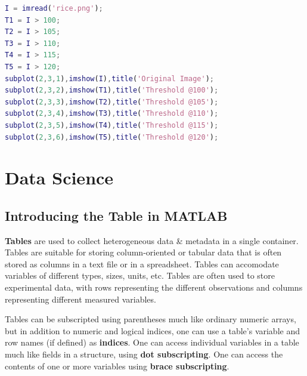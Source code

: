 \documentclass[11pt]{article}
\begin{document}
\begin{lstlisting}[language=MATLAB]
I = imread('rice.png');
T1 = I > 100;
T2 = I > 105;
T3 = I > 110;
T4 = I > 115;
T5 = I > 120;
subplot(2,3,1),imshow(I),title('Original Image');
subplot(2,3,2),imshow(T1),title('Threshold @100');
subplot(2,3,3),imshow(T2),title('Threshold @105');
subplot(2,3,4),imshow(T3),title('Threshold @110');
subplot(2,3,5),imshow(T4),title('Threshold @115');
subplot(2,3,6),imshow(T5),title('Threshold @120');
\end{lstlisting}

\section{Data Science}
\subsection{Introducing the Table in MATLAB} 
\textbf{Tables} are used to collect heterogeneous data \& metadata in a single container. 
Tables are suitable for storing column-oriented or tabular data that is often stored as columns in a text file or in a spreadsheet.
Tables can accomodate variables of different types, sizes, units, etc. 
Tables are often used to store experimental data, with rows representing the different observations and columns representing different measured variables.

Tables can be subscripted using parentheses much like ordinary numeric arrays, but in addition to numeric and logical indices, one can use a table's variable and row names (if defined) as \textbf{indices}.  
One can access individual variables in a table much like fields in a structure, using \textbf{dot subscripting}.  
One can access the contents of one or more variables using \textbf{brace subscripting}.



\end{document}
